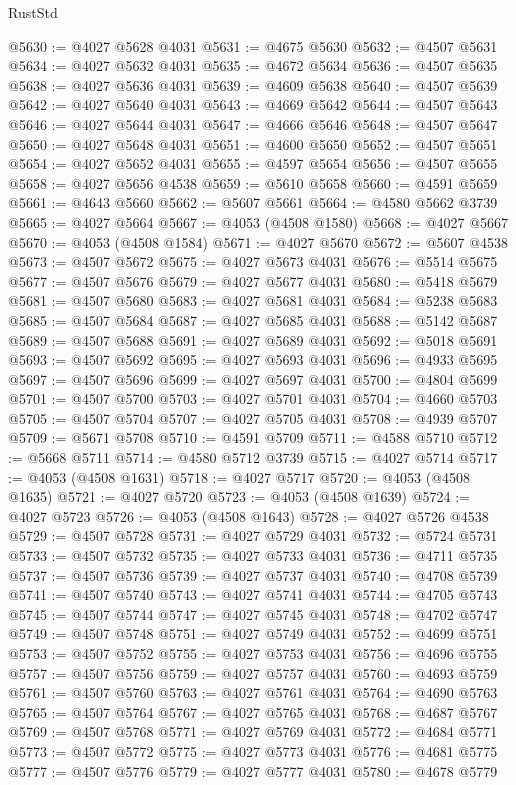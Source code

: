 \begin{lexlean}{RustStd}
\begin{coremodule}
@5630 := @4027 @5628 @4031
@5631 := @4675 @5630
@5632 := @4507 @5631
@5634 := @4027 @5632 @4031
@5635 := @4672 @5634
@5636 := @4507 @5635
@5638 := @4027 @5636 @4031
@5639 := @4609 @5638
@5640 := @4507 @5639
@5642 := @4027 @5640 @4031
@5643 := @4669 @5642
@5644 := @4507 @5643
@5646 := @4027 @5644 @4031
@5647 := @4666 @5646
@5648 := @4507 @5647
@5650 := @4027 @5648 @4031
@5651 := @4600 @5650
@5652 := @4507 @5651
@5654 := @4027 @5652 @4031
@5655 := @4597 @5654
@5656 := @4507 @5655
@5658 := @4027 @5656 @4538
@5659 := @5610 @5658
@5660 := @4591 @5659
@5661 := @4643 @5660
@5662 := @5607 @5661
@5664 := @4580 @5662 @3739
@5665 := @4027 @5664
@5667 := @4053 (@4508 @1580)
@5668 := @4027 @5667
@5670 := @4053 (@4508 @1584)
@5671 := @4027 @5670
@5672 := @5607 @4538
@5673 := @4507 @5672
@5675 := @4027 @5673 @4031
@5676 := @5514 @5675
@5677 := @4507 @5676
@5679 := @4027 @5677 @4031
@5680 := @5418 @5679
@5681 := @4507 @5680
@5683 := @4027 @5681 @4031
@5684 := @5238 @5683
@5685 := @4507 @5684
@5687 := @4027 @5685 @4031
@5688 := @5142 @5687
@5689 := @4507 @5688
@5691 := @4027 @5689 @4031
@5692 := @5018 @5691
@5693 := @4507 @5692
@5695 := @4027 @5693 @4031
@5696 := @4933 @5695
@5697 := @4507 @5696
@5699 := @4027 @5697 @4031
@5700 := @4804 @5699
@5701 := @4507 @5700
@5703 := @4027 @5701 @4031
@5704 := @4660 @5703
@5705 := @4507 @5704
@5707 := @4027 @5705 @4031
@5708 := @4939 @5707
@5709 := @5671 @5708
@5710 := @4591 @5709
@5711 := @4588 @5710
@5712 := @5668 @5711
@5714 := @4580 @5712 @3739
@5715 := @4027 @5714
@5717 := @4053 (@4508 @1631)
@5718 := @4027 @5717
@5720 := @4053 (@4508 @1635)
@5721 := @4027 @5720
@5723 := @4053 (@4508 @1639)
@5724 := @4027 @5723
@5726 := @4053 (@4508 @1643)
@5728 := @4027 @5726 @4538
@5729 := @4507 @5728
@5731 := @4027 @5729 @4031
@5732 := @5724 @5731
@5733 := @4507 @5732
@5735 := @4027 @5733 @4031
@5736 := @4711 @5735
@5737 := @4507 @5736
@5739 := @4027 @5737 @4031
@5740 := @4708 @5739
@5741 := @4507 @5740
@5743 := @4027 @5741 @4031
@5744 := @4705 @5743
@5745 := @4507 @5744
@5747 := @4027 @5745 @4031
@5748 := @4702 @5747
@5749 := @4507 @5748
@5751 := @4027 @5749 @4031
@5752 := @4699 @5751
@5753 := @4507 @5752
@5755 := @4027 @5753 @4031
@5756 := @4696 @5755
@5757 := @4507 @5756
@5759 := @4027 @5757 @4031
@5760 := @4693 @5759
@5761 := @4507 @5760
@5763 := @4027 @5761 @4031
@5764 := @4690 @5763
@5765 := @4507 @5764
@5767 := @4027 @5765 @4031
@5768 := @4687 @5767
@5769 := @4507 @5768
@5771 := @4027 @5769 @4031
@5772 := @4684 @5771
@5773 := @4507 @5772
@5775 := @4027 @5773 @4031
@5776 := @4681 @5775
@5777 := @4507 @5776
@5779 := @4027 @5777 @4031
@5780 := @4678 @5779

\end{coremodule}
\end{lexlean}
